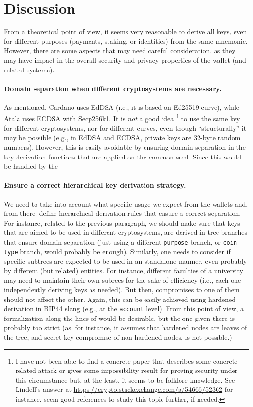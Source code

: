 \section{Discussion}
\label{sec:discussion}

From a theoretical point of view, it seems very reasonable to derive all
keys, even for different purposes (payments, staking, or identities) from
the same mnemonic. However, there are some aspects that may need careful
consideration, as they may have impact in the overall security and privacy
properties of the wallet (and related systems).

\paragraph{Domain separation when different cryptosystems are
  necessary.} %
As mentioned, Cardano uses EdDSA (i.e., it is based on Ed25519 curve),
while Atala uses ECDSA with Secp256k1. It is \emph{not} a good idea%
\footnote{I have not been able to find a concrete paper that describes
  some concrete related attack or gives some impossibility result for
  proving security under this circumstance but, at the least, it seems to
  be folklore knowledge. See Lindell's answer at
  \url{https://crypto.stackexchange.com/a/54666/52362} for instance.
  \cite{dlp12+,thorm21} seem good references to study this topic further, if
  needed.} to use the same key for different cryptosystems, nor for different
curves, even though ``structurally'' it may be possible (e.g., in EdDSA and
ECDSA, private keys are 32-byte random numbers). However, this is easily
avoidable by ensuring domain separation in the key derivation functions that
are applied on the common seed. Since this would be handled by the 

\paragraph{Ensure a correct hierarchical key derivation strategy.} %
We need to take into account what specific usage we expect from the wallets
and, from there, define hierarchical derivation rules that ensure a correct
separation. For instance, related to the previous paragraph, we should make
sure that keys that are aimed to be used in different cryptosystems, are
derived in tree branches that ensure domain separation (just using a
different \texttt{purpose} branch, or \texttt{coin type} branch, would probably
be enough). Similarly, one needs to consider if specific subtrees are expected
to be used in an standalone manner, even probably by different (but related)
entities. For instance, different faculties of a university may need to maintain
their own subrees for the sake of efficiency (i.e., each one independently
deriving keys as needed). But then, compromises to one of them should not
affect the other. Again, this can be easily achieved using hardened
derivation in BIP44 slang (e.g., at the \texttt{account} level). From this
point of view, a formalization along the lines of \cite{def+21} would be
desirable, but the one given there is probably too strict (as, for instance,
it assumes that hardened nodes are leaves of the tree, and secret key
compromise of non-hardened nodes, is not possible.)

